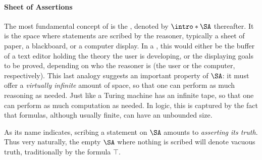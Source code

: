 \paragraph{Sheet of Assertions}

\AP
The most fundamental concept of  is the ,
denoted by $\intro*\SA$ thereafter. It is the space where statements are scribed
by the reasoner, typically a sheet of paper, a blackboard, or a computer
display. In a , this would either be the buffer of a text editor
holding the theory the user is developing, or the  displaying goals to
be proved, depending on who the reasoner is (the user or the computer,
respectively). This last analogy suggests an important property of $\SA$: it
must offer a \emph{virtually infinite} amount of space, so that one can perform
as much reasoning as needed. Just like a Turing machine has an infinite tape, so
that one can perform as much computation as needed. In  logic, this is
captured by the fact that formulas, although usually finite, can have an
unbounded size.

As its name indicates, scribing a statement on $\SA$ amounts to \emph{asserting
its truth}. Thus very naturally, the empty $\SA$ where nothing is scribed will
denote vacuous truth, traditionally  by the formula $\top$.


